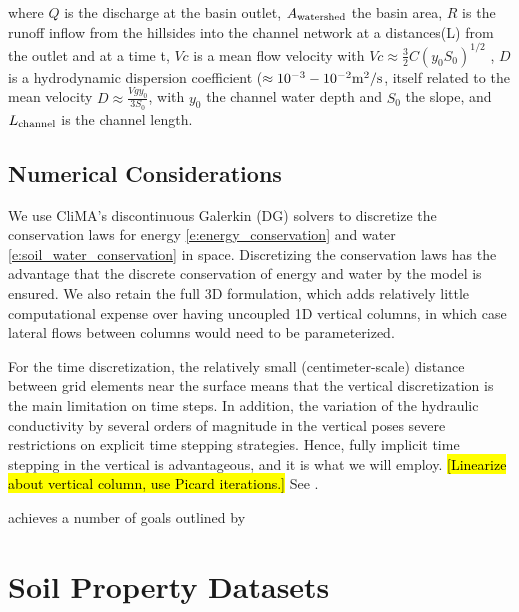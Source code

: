 \documentclass[twoside,10pt]{report}
\begin{document}
where $Q$ is  the  discharge  at  the  basin  outlet, $A_{\rm watershed}$ the basin area, $R$ is the runoff inflow from the hillsides into the channel network at a distances(L) from the outlet and at a time t, $Vc$ is  a  mean  flow velocity with $Vc \approx \frac{3}{2} C (y_0S_0)^{1/2}$ \citep{Rinaldo1991}, $D$ is  a hydrodynamic dispersion coefficient ($\approx 10^{-3}-10^{-2} {\rm m^2/s}$, itself related to the mean velocity $D \approx \frac{Vg y_0}{3 S_0}$, with $y_0$ the channel water depth and $S_0$ the slope, and $L_{\rm channel}$ is the channel length.

\subsection{Numerical Considerations}

We use CliMA's discontinuous Galerkin (DG) solvers \citep[cf.][]{Maet14a} to discretize the conservation laws for energy \eqref{e:energy_conservation} and water \eqref{e:soil_water_conservation} in space. Discretizing the conservation laws has the advantage that the discrete conservation of energy and water by the model is ensured. We also retain the full 3D formulation, which adds relatively little computational expense over having uncoupled 1D vertical columns, in which case lateral flows between columns would need to be parameterized. 

For the time discretization, the relatively small (centimeter-scale) distance between grid elements near the surface means that the vertical discretization is the main limitation on time steps. In addition, the variation of the hydraulic conductivity by several orders of magnitude in the vertical poses severe restrictions on explicit time stepping strategies. Hence, fully implicit time stepping in the vertical is advantageous, and it is what we will employ. \hl{[Linearize about vertical column, use Picard iterations.]} See \citet{List16a}. 

achieves a number of goals outlined by \citep{Clark15a}

\section{Soil Property Datasets}\label{s:soil_data}
\end{document}
